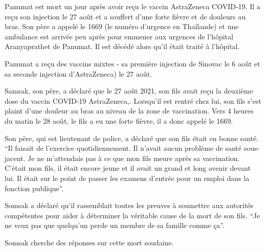 Panumat est mort un jour après avoir reçu le vaccin AstraZeneca COVID-19. Il a
reçu son injection le 27 août et a souffert d'une forte fièvre et de douleurs au
bras. Son père a appelé le 1669 (le numéro d'urgence en Thaïlande) et une
ambulance est arrivée peu après pour emmener aux urgences de l'hôpital
Aranyaprathet de Panumat. Il est décédé alors qu'il était traité à l'hôpital.

Panumat a reçu des vaccins mixtes - sa première injection de Sinovac le 6 août
et sa seconde injection d'AstraZeneca) le 27 août.

Samsak, son père, a déclaré que le 27 août 2021, son fils avait reçu la deuxième
dose du vaccin COVID-19 AstraZeneca,. Lorsqu'il est rentré chez lui, son fils
s'est plaint d'une douleur au bras au niveau de la zone de vaccination. Vers 4
heures du matin le 28 août, le fils a eu une forte fièvre, il a donc appelé le
1669.

Son père, qui est lieutenant de police, a déclaré que son fils était en bonne
santé. “Il faisait de l'exercice quotidiennement. Il n'avait aucun problème de
santé sous-jacent. Je ne m'attendais pas à ce que mon fils meure après sa
vaccination. C'était mon fils, il était encore jeune et il avait un grand et
long avenir devant lui. Il était sur le point de passer les examens d'entrée
pour un emploi dans la fonction publique”.

Somsak a déclaré qu'il rassemblait toutes les preuves à soumettre aux autorités
compétentes pour aider à déterminer la véritable cause de la mort de son
fils. “Je ne veux pas que quelqu'un perde un membre de sa famille comme ça”.

Somsak cherche des réponses sur cette mort soudaine.

